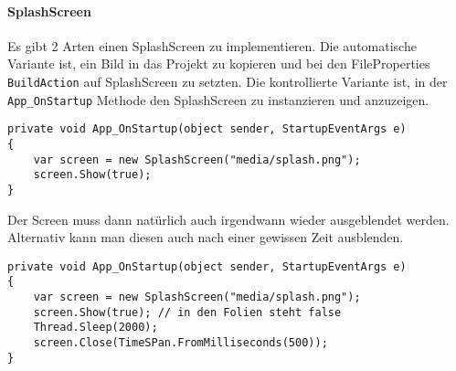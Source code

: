 \paragraph{SplashScreen} Es gibt 2 Arten einen SplashScreen zu implementieren. Die automatische Variante ist, ein Bild in das Projekt zu kopieren und bei den FileProperties \verb+BuildAction+ auf SplashScreen zu setzten. Die kontrollierte Variante ist, in der \verb+App_OnStartup+ Methode den SplashScreen zu instanzieren und anzuzeigen.
\begin{lstlisting}
private void App_OnStartup(object sender, StartupEventArgs e)
{
    var screen = new SplashScreen("media/splash.png");
    screen.Show(true);
}
\end{lstlisting}
Der Screen muss dann natürlich auch irgendwann wieder ausgeblendet werden. Alternativ kann man diesen auch nach einer gewissen Zeit ausblenden.
\begin{lstlisting}
private void App_OnStartup(object sender, StartupEventArgs e)
{
    var screen = new SplashScreen("media/splash.png");
    screen.Show(true); // in den Folien steht false
    Thread.Sleep(2000);
    screen.Close(TimeSPan.FromMilliseconds(500));
}
\end{lstlisting}
